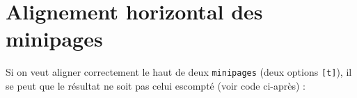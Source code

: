 \remarque*{
	L'extension \texttt{\href{http://mirror.ctan.org/macros/latex/contrib/subfig/subfig.pdf}{subfig}} permet aussi de faire ce type de mise en page, mais elle a des incompatibilités avec \texttt{hyperref}.
}





\section{Alignement horizontal des minipages}

Si on veut aligner correctement le haut de deux \texttt{minipages} (deux options \texttt{[t]}), il se peut que le résultat ne soit pas celui escompté (voir code ci-après) :

